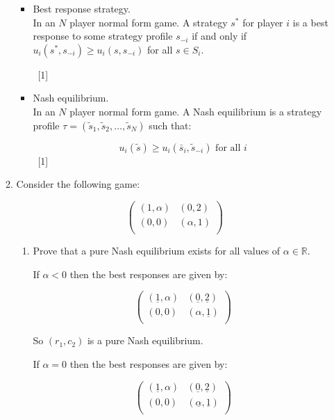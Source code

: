 \documentclass[12pt,a4paper]{article}
\begin{document}
\begin{enumerate}
\begin{enumerate}
\begin{itemize}
                \item Best response strategy.\\

                In an $N$ player normal form game. A strategy $s^*$ for player $i$ is a best response to some strategy profile $s_{-i}$ if and only if $u_i(s^*,s_{-i})\geq u_{i}(s,s_{-i})$ for all $s\in S_i$.

                ~\hfill{[1]}

                \item Nash equilibrium.\\

                In an $N$ player normal form game. A Nash equilibrium is a strategy profile $\tau = (\tilde s_1,\tilde s_2,\dots,\tilde s_N)$ such that:

                $$u_i(\tilde s)\geq u_i(\bar s_i,\tilde s_{-i})\text{ for all }i$$
                ~\hfill{[1]}
            \end{itemize}

        \item     Consider the following game:

            \[\begin{pmatrix}
            (1,\alpha) & (0,2)\\
            (0,0) & (\alpha,1)\\
            \end{pmatrix}\]

            \begin{enumerate}
            \item Prove that a pure Nash equilibrium exists for all values of
                \(\alpha \in \mathbb{R}\).

                If \(\alpha< 0\) then the best responses are given by:

                    \[\begin{pmatrix}
                        (\underline{1},\alpha) & (\underline{0},\underline{2})\\
                        (0,0) & (\alpha,\underline{1})\\
                    \end{pmatrix}\]

                So \((r_1, c_2)\) is a pure Nash equilibrium.

                If \(\alpha=0\) then the best responses are given by:

                    \[\begin{pmatrix}
                        (\underline{1},\alpha) & (\underline{0},\underline{2})\\
                            (0,0) & (\underline{\alpha},\underline{1})\\
                    \end{pmatrix}\]


\end{enumerate}
\end{enumerate}
\end{enumerate}
\end{document}
